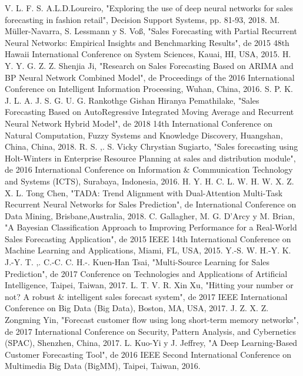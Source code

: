 \documentclass[conference]{IEEEtran}
\begin{document}
\begin{thebibliography}{00}
     V. L. F. S. A.L.D.Loureiro, "Exploring the use of deep neural networks for sales forecasting in fashion retail", Decision Support Systems, pp. 81-93, 2018.
     M. Müller-Navarra, S. Lessmann y S. Voß, "Sales Forecasting with Partial Recurrent Neural Networks: Empirical Insights and Benchmarking Results", de 2015 48th Hawaii International Conference on System Sciences, Kauai, HI, USA, 2015.
     H. Y. Y. G. Z. Z. Shenjia Ji, "Research on Sales Forecasting Based on ARIMA and BP Neural Network Combined Model", de Proceedings of the 2016 International Conference on Intelligent Information Processing, Wuhan, China, 2016.
     S. P. K. J. L. A. J. S. G. U. G. Rankothge Gishan Hiranya Pemathilake, "Sales Forecasting Based on AutoRegressive Integrated Moving Average and Recurrent Neural Network Hybrid Model", de 2018 14th International Conference on Natural Computation, Fuzzy Systems and Knowledge Discovery, Huangshan, China, China, 2018.
     R. S. ,. S. Vicky Chrystian Sugiarto, "Sales forecasting using Holt-Winters in Enterprise Resource Planning at sales and distribution module", de 2016 International Conference on Information \& Communication Technology and Systems (ICTS), Surabaya, Indonesia, 2016.
     H. Y. H. C. L. W. H. W. X. Z. X. L. Tong Chen, "TADA: Trend Alignment with Dual-Attention Multi-Task Recurrent Neural Networks for Sales Prediction", de International Conference on Data Mining, Brisbane,Australia, 2018.
     C. Gallagher, M. G. D’Arcy y M. Brian, "A Bayesian Classification Approach to Improving Performance for a Real-World Sales Forecasting Application", de 2015 IEEE 14th International Conference on Machine Learning and Applications, Miami, FL, USA, 2015.
     Y.-S. W. H.-Y. K. J.-Y. T. ,. C.-C. C. H.-. Kuen-Han Tsai, "Multi-Source Learning for Sales Prediction", de 2017 Conference on Technologies and Applications of Artificial Intelligence, Taipei, Taiwan, 2017.
     L. T. V. R. Xin Xu, "Hitting your number or not? A robust \& intelligent sales forecast system", de 2017 IEEE International Conference on Big Data (Big Data), Boston, MA, USA, 2017.
     J. Z. X. Z. Zongming Yin, "Forecast customer flow using long short-term memory networks", de 2017 International Conference on Security, Pattern Analysis, and Cybernetics (SPAC), Shenzhen, China, 2017.
     L. Kuo-Yi y J. Jeffrey, "A Deep Learning-Based Customer Forecasting Tool", de 2016 IEEE Second International Conference on Multimedia Big Data (BigMM), Taipei, Taiwan, 2016.

\end{thebibliography}
\end{document}
